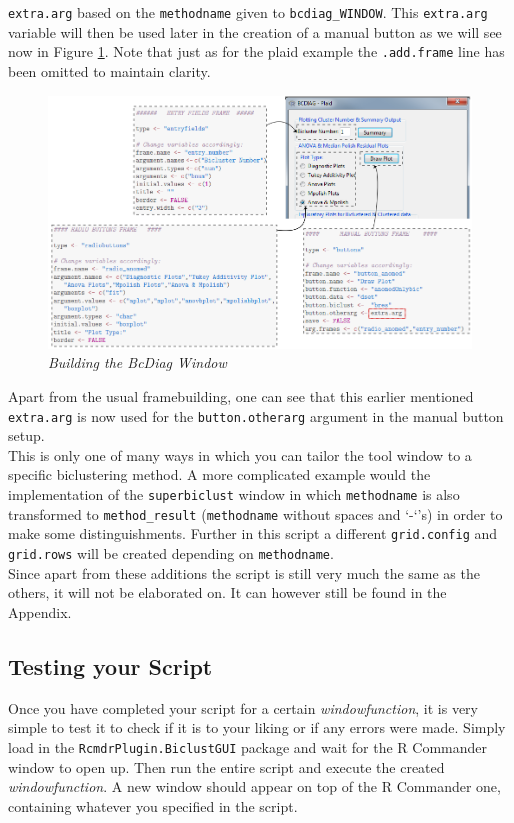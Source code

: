 \documentclass[a4paper]{article}\usepackage[]{graphicx}\usepackage[]{color}
\begin{document}
\verb|extra.arg| based on the \verb|methodname| given to \verb|bcdiag_WINDOW|.
This \verb|extra.arg| variable will then be used later in the creation of a
manual button as we will see now in Figure \ref{bcdiag_build}. Note that just as
for the plaid example the \verb|.add.frame| line has been omitted to maintain
clarity.
\begin{figure}[H]
\centering
\includegraphics[scale=0.45]{figures/bcdiag_build.png}
\caption{{\it Building the BcDiag Window}
\label{bcdiag_build}}
\end{figure}
\noindent Apart from the usual framebuilding, one can see that this earlier
mentioned \verb|extra.arg| is now used for the \verb|button.otherarg| argument in the
manual button setup. \\
This is only one of many ways in which you can tailor the tool window to a
specific biclustering method. A more complicated example would the implementation of the
\verb|superbiclust| window in which \verb|methodname| is also transformed to
\verb|method_result| (\verb|methodname| without spaces and `-`'s) in order to
make some distinguishments. Further in this script a different
\verb|grid.config| and \verb|grid.rows| will be created depending on
\verb|methodname|.\\
Since apart from these additions the script is still very much the same as the
others, it will not be elaborated on. It can however still be found in the
Appendix.
\subsection{Testing your Script}
\noindent Once you have completed your script for a certain {\it
windowfunction}, it is very simple to test it to check if it is to your liking
or if any errors were made. Simply load in the \verb|RcmdrPlugin.BiclustGUI|
package and wait for the R Commander window to open up. Then run the entire
script and execute the created {\it windowfunction}. A new window should appear
on top of the R Commander one, containing whatever you specified in the script.
\end{document}
